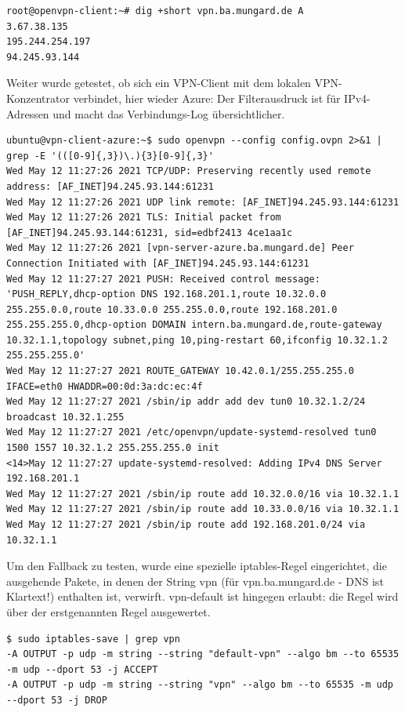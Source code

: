 \begin{lstlisting}[label=dig-matchall-ip,caption=.]
root@openvpn-client:~# dig +short vpn.ba.mungard.de A
3.67.38.135
195.244.254.197
94.245.93.144
\end{lstlisting}

Weiter wurde getestet, ob sich ein VPN-Client mit dem lokalen VPN-Konzentrator verbindet, hier wieder Azure:
Der Filterausdruck ist für IPv4-Adressen und macht das Verbindungs-Log übersichtlicher.
\begin{lstlisting}[label=connection-to-vpn-normal,caption=.]
ubuntu@vpn-client-azure:~$ sudo openvpn --config config.ovpn 2>&1 | grep -E '(([0-9]{,3})\.){3}[0-9]{,3}'
Wed May 12 11:27:26 2021 TCP/UDP: Preserving recently used remote address: [AF_INET]94.245.93.144:61231
Wed May 12 11:27:26 2021 UDP link remote: [AF_INET]94.245.93.144:61231
Wed May 12 11:27:26 2021 TLS: Initial packet from [AF_INET]94.245.93.144:61231, sid=edbf2413 4ce1aa1c
Wed May 12 11:27:26 2021 [vpn-server-azure.ba.mungard.de] Peer Connection Initiated with [AF_INET]94.245.93.144:61231
Wed May 12 11:27:27 2021 PUSH: Received control message: 'PUSH_REPLY,dhcp-option DNS 192.168.201.1,route 10.32.0.0 255.255.0.0,route 10.33.0.0 255.255.0.0,route 192.168.201.0 255.255.255.0,dhcp-option DOMAIN intern.ba.mungard.de,route-gateway 10.32.1.1,topology subnet,ping 10,ping-restart 60,ifconfig 10.32.1.2 255.255.255.0'
Wed May 12 11:27:27 2021 ROUTE_GATEWAY 10.42.0.1/255.255.255.0 IFACE=eth0 HWADDR=00:0d:3a:dc:ec:4f
Wed May 12 11:27:27 2021 /sbin/ip addr add dev tun0 10.32.1.2/24 broadcast 10.32.1.255
Wed May 12 11:27:27 2021 /etc/openvpn/update-systemd-resolved tun0 1500 1557 10.32.1.2 255.255.255.0 init
<14>May 12 11:27:27 update-systemd-resolved: Adding IPv4 DNS Server 192.168.201.1
Wed May 12 11:27:27 2021 /sbin/ip route add 10.32.0.0/16 via 10.32.1.1
Wed May 12 11:27:27 2021 /sbin/ip route add 10.33.0.0/16 via 10.32.1.1
Wed May 12 11:27:27 2021 /sbin/ip route add 192.168.201.0/24 via 10.32.1.1
\end{lstlisting}

Um den Fallback zu testen, wurde eine spezielle iptables-Regel eingerichtet, die ausgehende Pakete, in denen der String \glqq vpn\grqq{} (für vpn.ba.mungard.de - DNS ist Klartext!) enthalten ist, verwirft. vpn-default ist hingegen erlaubt: die Regel wird über der erstgenannten Regel ausgewertet.

\begin{lstlisting}[label=iptables-drop-dns,caption=.]
$ sudo iptables-save | grep vpn
-A OUTPUT -p udp -m string --string "default-vpn" --algo bm --to 65535 -m udp --dport 53 -j ACCEPT
-A OUTPUT -p udp -m string --string "vpn" --algo bm --to 65535 -m udp --dport 53 -j DROP
\end{lstlisting}

